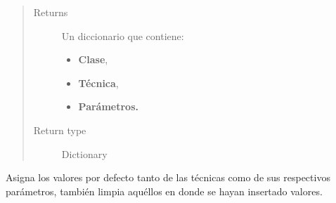 \documentclass[class=report, crop=false]{standalone}
\begin{document}
\begin{fulllineitems}
\begin{fulllineitems}
\begin{quote}\begin{description}
\item[{Returns}] \leavevmode

Un diccionario que contiene:

\begin{itemize}
\item \textbf{Clase},
\item \textbf{Técnica},
\item \textbf{Parámetros.}
\end{itemize}

\item[{Return type}] \leavevmode
Dictionary
\end{description}\end{quote}

\end{fulllineitems}

\begin{fulllineitems}

Asigna los valores por defecto tanto de las técnicas como 
de sus respectivos parámetros, también limpia aquéllos en 
donde se hayan insertado valores.

\end{fulllineitems}

\end{fulllineitems}
\end{document}
